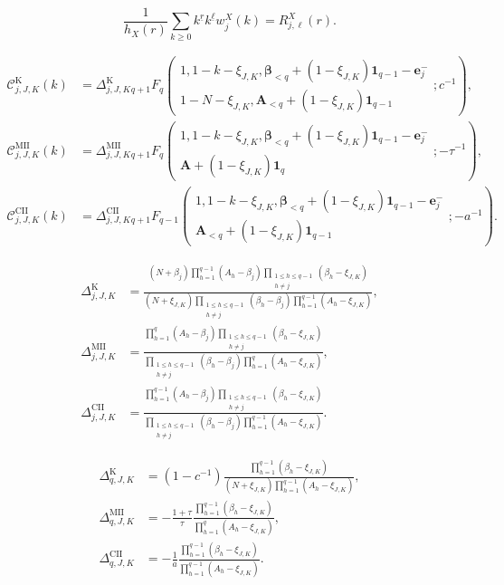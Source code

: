 \documentclass[10pt,a4paper]{amsart}
\newcommand{\A}{\boldsymbol A}
\newcommand{\bbeta}{\boldsymbol\beta}
\newcommand{\ee}{\boldsymbol e}
\newcommand{\fall}[2]{#1^{\underline{#2}}}
\newcommand{\one}{\boldsymbol 1}
\newcommand{\pFq}[5]{{}_{#1}F_{#2}\!\left(\begin{matrix}#3\\#4\end{matrix};#5\right)}
\begin{document}
\begin{equation}
 \frac1{h_X(r)}\sum_{k\ge0}\fall{k}{r}\fall{k}{\ell}w_j^X(k)
 =R_{j,\ell}^X(r).
 \label{eq:unreflected-R-pairing}
\end{equation}

\begin{align}
 \mathcal C_{j,J,K}^{\mathrm K}(k)
 &=\Delta_{j,J,K}^{\mathrm K}
 \pFq{q+1}{q}
 {1,1-k-\xi_{J,K},
  \bbeta_{<q}+(1-\xi_{J,K})\one_{q-1}-\ee_j^-}
 {1-N-\xi_{J,K},
  \A_{<q}+(1-\xi_{J,K})\one_{q-1}}{c^{-1}},
 \label{eq:K-finite-pole-block}\\
 \mathcal C_{j,J,K}^{\mathrm{MII}}(k)
 &=\Delta_{j,J,K}^{\mathrm{MII}}
 \pFq{q+1}{q}
 {1,1-k-\xi_{J,K},
  \bbeta_{<q}+(1-\xi_{J,K})\one_{q-1}-\ee_j^-}
 {\A+(1-\xi_{J,K})\one_q}{-\tau^{-1}},
 \label{eq:MII-finite-pole-block}\\
 \mathcal C_{j,J,K}^{\mathrm{CII}}(k)
 &=\Delta_{j,J,K}^{\mathrm{CII}}
 \pFq{q+1}{q-1}
 {1,1-k-\xi_{J,K},
  \bbeta_{<q}+(1-\xi_{J,K})\one_{q-1}-\ee_j^-}
 {\A_{<q}+(1-\xi_{J,K})\one_{q-1}}{-a^{-1}}.
 \label{eq:CII-finite-pole-block}
\end{align}

\begin{align}
 \Delta_{j,J,K}^{\mathrm K}
 &=\frac{(N+\beta_j)
   \prod_{h=1}^{q-1}(A_h-\beta_j)
   \prod_{\substack{1\le h\le q-1\\h\ne j}}(\beta_h-\xi_{J,K})}
  {(N+\xi_{J,K})
   \prod_{\substack{1\le h\le q-1\\h\ne j}}(\beta_h-\beta_j)
   \prod_{h=1}^{q-1}(A_h-\xi_{J,K})},
 \label{eq:K-finite-pole-prefactor-row}\\
 \Delta_{j,J,K}^{\mathrm{MII}}
 &=\frac{\prod_{h=1}^{q}(A_h-\beta_j)
   \prod_{\substack{1\le h\le q-1\\h\ne j}}(\beta_h-\xi_{J,K})}
  {\prod_{\substack{1\le h\le q-1\\h\ne j}}(\beta_h-\beta_j)
   \prod_{h=1}^{q}(A_h-\xi_{J,K})},
 \label{eq:MII-finite-pole-prefactor-row}\\
 \Delta_{j,J,K}^{\mathrm{CII}}
 &=\frac{\prod_{h=1}^{q-1}(A_h-\beta_j)
   \prod_{\substack{1\le h\le q-1\\h\ne j}}(\beta_h-\xi_{J,K})}
  {\prod_{\substack{1\le h\le q-1\\h\ne j}}(\beta_h-\beta_j)
   \prod_{h=1}^{q-1}(A_h-\xi_{J,K})}.
 \label{eq:CII-finite-pole-prefactor-row}
\end{align}

\begin{align}
 \Delta_{q,J,K}^{\mathrm K}
 &=(1-c^{-1})
   \frac{\prod_{h=1}^{q-1}(\beta_h-\xi_{J,K})}
   {(N+\xi_{J,K})\prod_{h=1}^{q-1}(A_h-\xi_{J,K})},
 \label{eq:K-finite-pole-prefactor-base}\\
 \Delta_{q,J,K}^{\mathrm{MII}}
 &=-\frac{1+\tau}{\tau}
   \frac{\prod_{h=1}^{q-1}(\beta_h-\xi_{J,K})}
   {\prod_{h=1}^{q}(A_h-\xi_{J,K})},
 \label{eq:MII-finite-pole-prefactor-base}\\
 \Delta_{q,J,K}^{\mathrm{CII}}
 &=-\frac1a
   \frac{\prod_{h=1}^{q-1}(\beta_h-\xi_{J,K})}
   {\prod_{h=1}^{q-1}(A_h-\xi_{J,K})}.
 \label{eq:CII-finite-pole-prefactor-base}
\end{align}
\end{document}
